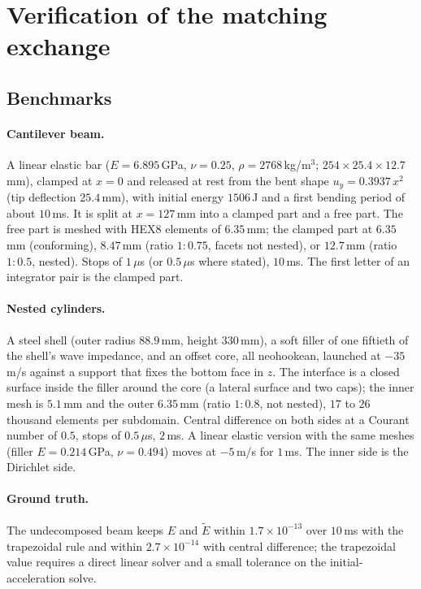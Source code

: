 \documentclass[11pt]{article}
\begin{document}
\section{Verification of the matching exchange}
\label{sec:verification}

\subsection{Benchmarks}
\label{sec:benchmarks}

\paragraph{Cantilever beam.} A linear elastic bar ($E = 6.895$\,GPa,
$\nu = 0.25$, $\rho = 2768$\,kg/m$^3$; $254 \times 25.4 \times 12.7$\,mm),
clamped at $x = 0$ and released at rest from the bent shape
$u_y = 0.3937\,x^2$ (tip deflection $25.4$\,mm), with initial energy
$1506$\,J and a first bending period of about $10$\,ms. It is split at
$x = 127$\,mm into a clamped part and a free part. The free part is meshed
with HEX8 elements of $6.35$\,mm; the clamped part at $6.35$\,mm
(conforming), $8.47$\,mm (ratio $1{:}0.75$, facets not nested), or
$12.7$\,mm (ratio $1{:}0.5$, nested). Stops of $1\,\mu$s (or $0.5\,\mu$s
where stated), $10$\,ms. The first letter of an integrator pair is the
clamped part.

\paragraph{Nested cylinders.} A steel shell (outer radius $88.9$\,mm,
height $330$\,mm), a soft filler of one fiftieth of the shell's wave
impedance, and an offset core, all neohookean, launched at $-35$\,m/s
against a support that fixes the bottom face in $z$. The interface is a
closed surface inside the filler around the core (a lateral surface and two
caps); the inner mesh is $5.1$\,mm and the outer $6.35$\,mm (ratio
$1{:}0.8$, not nested), $17$ to $26$ thousand elements per subdomain.
Central difference on both sides at a Courant number of $0.5$, stops of
$0.5\,\mu$s, $2$\,ms. A linear elastic version with the same meshes
(filler $E = 0.214$\,GPa, $\nu = 0.494$) moves at $-5$\,m/s for $1$\,ms.
The inner side is the Dirichlet side.

\paragraph{Ground truth.} The undecomposed beam keeps $E$ and $\tilde{E}$
within $1.7\times 10^{-13}$ over $10$\,ms with the trapezoidal rule and
within $2.7\times 10^{-14}$ with central difference; the trapezoidal value
requires a direct linear solver and a small tolerance on the
initial-acceleration solve.
\end{document}
